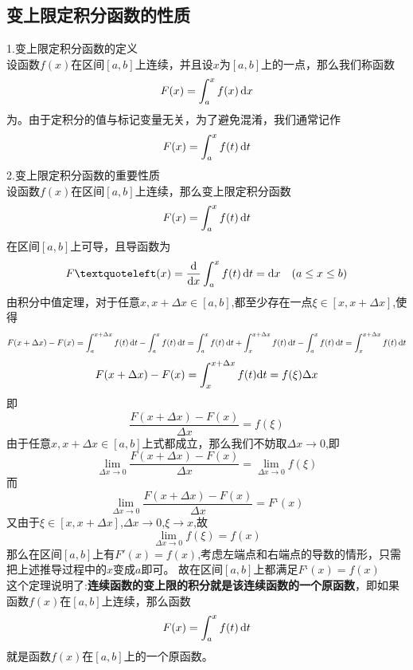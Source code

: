\subsection{变上限定积分函数的性质}
\noindent 1.变上限定积分函数的定义\\
\kg 设函数$f(x)$在区间$[a,b]$上连续，并且设$x$为$[a,b]$上的一点，那么我们称函数
\begin{equation}
	F(x)=\int_{a}^{x}f(x) \,{\rm{d}} x
\end{equation}
为。由于定积分的值与标记变量无关，为了避免混淆，我们通常记作
\begin{equation}
	F(x)=\int_{a}^{x}f(t)\,{\rm{d}} t
\end{equation}
2.变上限定积分函数的重要性质\\

\sj
\theorem[变上限定积分函数的性质]
设函数$f(x)$在区间$[a,b]$上连续，那么变上限定积分函数
\begin{equation}
	\nonumber
	F(x)=\int_{a}^{x}f(t) \,{\rm{d}} t
\end{equation}
在区间$[a,b]$上可导，且导函数为
\begin{equation}
	\nonumber
	F‘(x)=\frac{\d}{\d x}\int_{a}^{x}f(t) \,\d t=\d x  \hspace{1em}(a\leq x\leq b)
\end{equation}
\proof 由积分中值定理，对于任意$x,x+\Delta x\in[a,b]$,都至少存在一点$\xi\in[x,x+\Delta x]$,使得\sj
\begin{equation}
	\nonumber
	F(x+\Delta x)-F(x)=\int_{a}^{x+\Delta x}f(t)\,{\rm{d}} t-\int_{a}^{x}f(t)\,{\rm{d}} t=\int_{a}^{x}f(t)\,{\rm{d}} t+\int_{x}^{x+\Delta x}f(t)\,{\rm{d}} t-\int_{a}^{x}f(t)\,{\rm{d}} t=\int_{x}^{x+\Delta x}f(t)\,{\rm{d}} t
\end{equation}
\begin{equation}
	\nonumber
	F(x+\Delta x)-F(x)=\int_{x}^{x+\Delta x}f(t){\rm{d}} t=f(\xi)\Delta x
\end{equation}
即
\begin{equation}
	\nonumber
	\frac{F(x+\Delta x)-F(x)}{\Delta x}=f(\xi)
\end{equation}
由于任意$x,x+\Delta x\in[a,b]$上式都成立，那么我们不妨取$\Delta x\to 0$,即
\begin{equation}
	\nonumber
	\lim\limits_{\Delta x\to 0}	\frac{F(x+\Delta x)-F(x)}{\Delta x}=	\lim\limits_{\Delta x \to 0}f(\xi)
	\end{equation}
而
\begin{equation}
	\nonumber
	\lim\limits_{\Delta x\to 0}	\frac{F(x+\Delta x)-F(x)}{\Delta x}=F‘(x)
\end{equation}
又由于$\xi\in[x,x+\Delta x]$,$\Delta x\to0$,$\xi\to x$,故
\begin{equation}
	\nonumber
	\lim\limits_{\Delta x\to 0}f(\xi)=f(x)
\end{equation}
那么在区间$[a,b]$上有$F'(x)=f(x)$,考虑左端点和右端点的导数的情形，只需把上述推导过程中的$x$变成$a$即可。
故在区间$[a,b]$上都满足$F‘(x)=f(x)$
\\
这个定理说明了:\textbf{连续函数的变上限的积分就是该连续函数的一个原函数}，即如果函数$f(x)$在$[a,b]$上连续，那么函数
\begin{equation}
	\nonumber
F(x)=\int_{a}^{x}f(t) \,{\rm{d}} t
\end{equation}
就是函数$f(x)$在$[a,b]$上的一个原函数。
